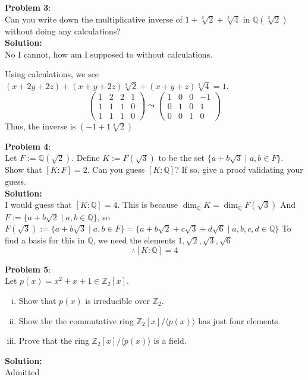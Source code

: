 \documentclass[11pt]{article}
\newcommand{\prob}[3]{\begin{flushleft}
        \textbf{Problem #1}: \\
        #2 
		\textbf{Solution:} 
		#3

\end{flushleft}}
\newcommand{\lr}[1]{
  \langle #1 \rangle
}
\begin{document}
\prob{3}{
  Can you write down the multiplicative inverse of $1 + \sqrt[3]{2} + \sqrt[3]{4}$ in $\mathbb{Q}(\sqrt[3]{2})$ without doing any calculations? \\
}{\\
  No I cannot, how am I supposed to without calculations.

  Using calculations, we see $(x + 2y + 2z) + (x + y + 2z) \sqrt[3]{2} + (x + y + z) \sqrt[3]{4} = 1$.
  $$\begin{pmatrix}
      1 & 2 & 2 & 1 \\
      1 & 1 & 1 & 0 \\
      1 & 1 & 1 & 0
    \end{pmatrix} \leadsto
    \begin{pmatrix}
      1 & 0 & 0 & -1 \\
      0 & 1 & 0 & 1  \\
      0 & 0 & 1 & 0
    \end{pmatrix}$$
  Thus, the inverse is $(-1 + 1 \sqrt[3]{2} )$
}

\prob{4}{
  Let $F := \mathbb{Q}(\sqrt{2})$. Define $K := F(\sqrt{3})$ to be the set $\{ a + b \sqrt{3} \mid a, b \in F \}$. Show that $[K : F] = 2$.
  Can you guess $[K : \mathbb{Q}]$? If so, give a proof validating your guess. \\
}{\\
  I would guess that $[K : \mathbb{Q}] = 4$.
  This is because $\dim_{\mathbb{Q}} K = \dim_{\mathbb{Q}} F(\sqrt{3})$
  And $F := \{ a + b \sqrt{2} \mid a,b \in \mathbb{Q} \}$, so
  $F(\sqrt{3}) := \{ a + b \sqrt{3} \mid a,b \in F \} = \{ a + b \sqrt{2} + c \sqrt{3} + d \sqrt{6} \mid a,b,c,d \in \mathbb{Q} \}$
  To find a basis for this in $\mathbb{Q}$, we need the elements $1, \sqrt{2}, \sqrt{3}, \sqrt{6}$
  $$\therefore [K : \mathbb{Q}] = 4$$
}

\prob{5}{
Let $p(x) = x^2 + x + 1 \in \mathbb{Z}_2[x]$.
\begin{enumerate}[(i)]
  \item Show that $p(x)$ is irreducible over $\mathbb{Z}_2$.
  \item Show the the commutative ring $\mathbb{Z}_2[x] / \lr{p(x)}$ has just four elements.
  \item Prove that the ring $\mathbb{Z}_2[x] / \lr{p(x)}$ is a field.
\end{enumerate}
}{\\
Admitted
}
\end{document}
